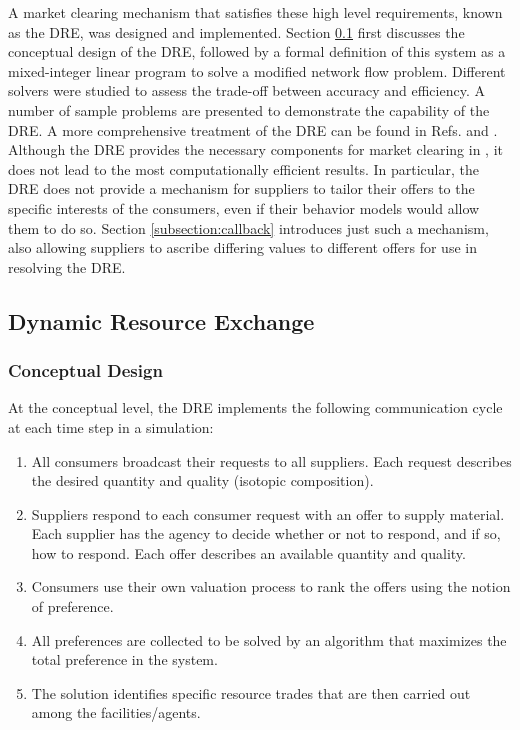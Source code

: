 A market clearing mechanism that satisfies these high level requirements,
known as the \gls{DRE}, was designed and implemented.  Section \ref{subsection:dre}
first discusses the conceptual design of the \gls{DRE}, followed by a formal
definition of this system as a mixed-integer linear program to solve a
modified network flow problem.  Different solvers were studied to assess the
trade-off between accuracy and efficiency.  A number of sample problems are
presented to demonstrate the capability of the \gls{DRE}.  A more
comprehensive treatment of the \gls{DRE} can be found in Refs. 
and .  Although the \gls{DRE} provides the necessary
components for market clearing in \Cyclus, it does not lead to the most
computationally efficient results.  In particular, the \gls{DRE} does not
provide a mechanism for suppliers to tailor their offers to the specific
interests of the consumers, even if their behavior models would allow them to
do so.  Section \ref{subsection:callback} introduces just such a mechanism, also
allowing suppliers to ascribe differing values to different offers for use
in resolving the \gls{DRE}.

\subsection{Dynamic Resource Exchange}\label{subsection:dre}

\subsubsection{Conceptual Design}

At the conceptual level, the \gls{DRE} implements the following communication
cycle at each time step in a \Cyclus simulation:
\begin{enumerate}
\item All consumers broadcast their requests to all suppliers.  Each request
  describes the desired quantity and quality (isotopic composition).
\item Suppliers respond to each consumer request with an offer to supply
  material.  Each supplier has the agency to decide whether or not to respond,
  and if so, how to respond.  Each offer describes an available quantity and
  quality.
\item Consumers use their own valuation process to rank the offers using the
  notion of preference.
\item All preferences are collected to be solved by an algorithm that maximizes
  the total preference in the system.
\item The solution identifies specific resource trades that are then carried
  out among the facilities/agents.
\end{enumerate}

